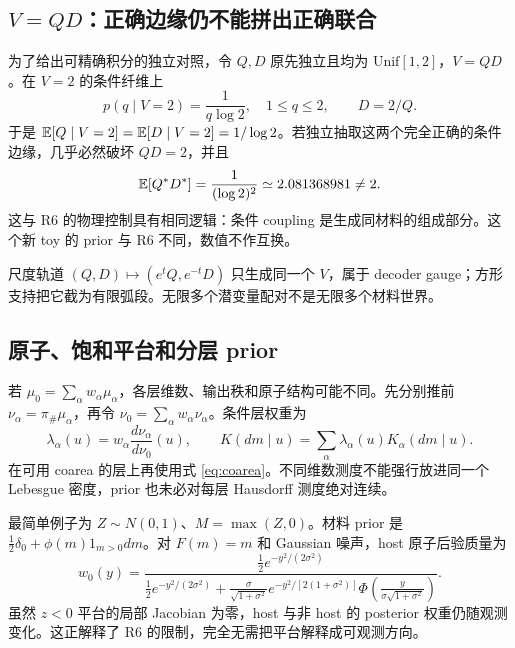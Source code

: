 \subsection{\texorpdfstring{$V=QD$}{V=QD}：正确边缘仍不能拼出正确联合}

为了给出可精确积分的独立对照，令 $Q,D$ 原先独立且均为 $\mathrm{Unif}[1,2]$，$V=QD$。在 $V=2$ 的条件纤维上
\begin{equation}
p(q\mid V=2)=\frac{1}{q\log2},\quad 1\le q\le2,\qquad D=2/Q.
\end{equation}
于是 $\mathbb E[Q\mid V=2]=\mathbb E[D\mid V=2]=1/\log2$。若独立抽取这两个完全正确的条件边缘，几乎必然破坏 $QD=2$，并且
\begin{equation}
\mathbb E[Q^*D^*]=\frac{1}{(\log2)^2}\simeq2.081368981\ne2.
\end{equation}
这与 R6 的物理控制具有相同逻辑：条件 coupling 是生成同材料的组成部分。这个新 toy 的 prior 与 R6 不同，数值不作互换。

尺度轨道 $(Q,D)\mapsto(e^tQ,e^{-t}D)$ 只生成同一个 $V$，属于 decoder gauge；方形支持把它截为有限弧段。无限多个潜变量配对不是无限多个材料世界。

\subsection{原子、饱和平台和分层 prior}

若 $\mu_0=\sum_\alpha w_\alpha\mu_\alpha$，各层维数、输出秩和原子结构可能不同。先分别推前 $\nu_\alpha=\pi_\#\mu_\alpha$，再令 $\nu_0=\sum_\alpha w_\alpha\nu_\alpha$。条件层权重为
\begin{equation}
\lambda_\alpha(u)=w_\alpha\frac{d\nu_\alpha}{d\nu_0}(u),
\qquad K(dm\mid u)=\sum_\alpha\lambda_\alpha(u)K_\alpha(dm\mid u).
\end{equation}
在可用 coarea 的层上再使用式 \eqref{eq:coarea}。不同维数测度不能强行放进同一个 Lebesgue 密度，prior 也未必对每层 Hausdorff 测度绝对连续。

最简单例子为 $Z\sim N(0,1)$、$M=\max(Z,0)$。材料 prior 是 $\frac12\delta_0+\phi(m)1_{m>0}dm$。对 $F(m)=m$ 和 Gaussian 噪声，host 原子后验质量为
\begin{equation}
w_0(y)=\frac{\tfrac12e^{-y^2/(2\sigma^2)}}
{\tfrac12e^{-y^2/(2\sigma^2)}+
\frac{\sigma}{\sqrt{1+\sigma^2}}e^{-y^2/[2(1+\sigma^2)]}
\Phi\!\left(\frac{y}{\sigma\sqrt{1+\sigma^2}}\right)}.
\end{equation}
虽然 $z<0$ 平台的局部 Jacobian 为零，host 与非 host 的 posterior 权重仍随观测变化。这正解释了 R6 的限制，完全无需把平台解释成可观测方向。

